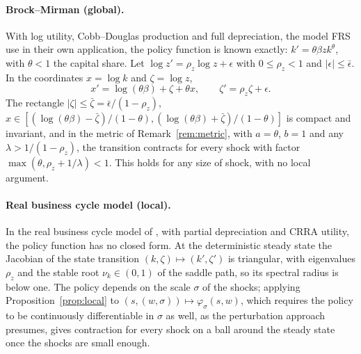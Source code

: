 \documentclass[11pt]{article}
\theoremstyle{definition}
\theoremstyle{remark}
\begin{document}
\paragraph{Brock--Mirman (global).} With log utility, Cobb--Douglas production and full
depreciation, the model FRS use in their own application, the policy function is known exactly:
$k' = \theta\beta z k^\theta$, with $\theta < 1$ the capital share. Let
$\log z' = \rho_z\log z + \epsilon$ with $0 \le \rho_z < 1$ and $|\epsilon| \le \bar\epsilon$. In the
coordinates $x = \log k$ and $\zeta = \log z$,
\[
  x' = \log(\theta\beta) + \zeta + \theta x, \qquad \zeta' = \rho_z\zeta + \epsilon .
\]
The rectangle $|\zeta| \le \bar\zeta = \bar\epsilon/(1-\rho_z)$,
$x \in [(\log(\theta\beta) - \bar\zeta)/(1-\theta), (\log(\theta\beta) + \bar\zeta)/(1-\theta)]$ is
compact and invariant, and in the metric of Remark~\ref{rem:metric}, with $a = \theta$, $b = 1$ and
any $\lambda > 1/(1-\rho_z)$, the transition contracts for every shock with factor
$\max(\theta, \rho_z + 1/\lambda) < 1$. This holds for any size of shock, with no local argument.

\paragraph{Real business cycle model (local).} In the real business cycle model of
\citet{KingPlosserRebelo1988}, with partial depreciation and CRRA utility, the policy function has
no closed form. At the deterministic steady state the Jacobian of the state
transition $(k, \zeta) \mapsto (k', \zeta')$ is triangular, with eigenvalues $\rho_z$ and the stable
root $\nu_k \in (0,1)$ of the saddle path, so its spectral radius is below one. The policy
depends on the scale $\sigma$ of the shocks; applying Proposition~\ref{prop:local} to
$(s, (w, \sigma)) \mapsto \varphi_\sigma(s, w)$, which requires the policy to be continuously
differentiable in $\sigma$ as well, as the perturbation approach presumes, gives contraction for
every shock on a ball around the steady state once the shocks are small enough.
\end{document}
